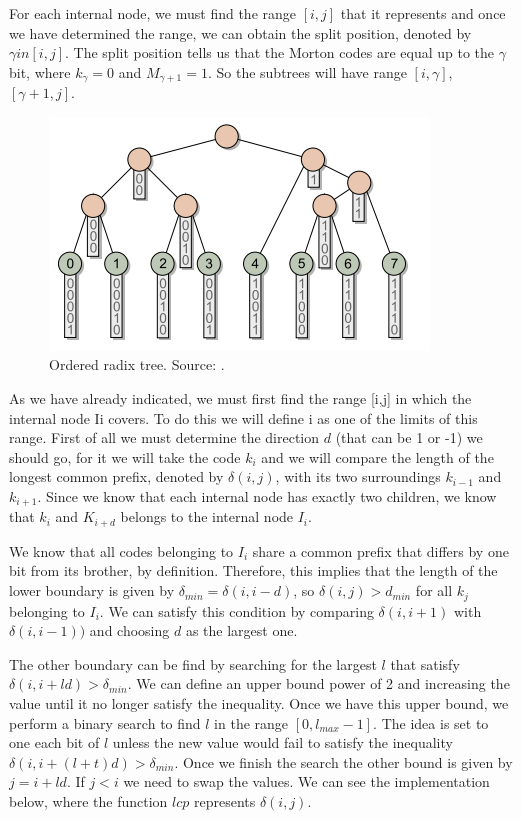 \documentclass[titlepage,12pt]{report}
\begin{document}
For each internal node, we must find the range $[i,j]$ that it represents and once we have determined the range, we can obtain the split position, denoted by $\gamma in [i,j]$. The split position tells us that the Morton codes are equal up to the $\gamma$ bit, where $k_{\gamma} = 0$ and $M_{\gamma +1} = 1$. So the subtrees will have range $[i, \gamma]$, $[\gamma+1,j]$.

\begin{figure}[H]
	\centering
	\includegraphics[scale=0.45]{media/radix_tero_1.png}
	\caption{Ordered radix tree. Source: \citep{Karras2012}.}
	\label{radix_tero}
\end{figure}

As we have already indicated, we must first find the range [i,j] in which the internal node Ii covers. To do this we will define i as one of the limits of this range. First of all we must determine the direction $d$ (that can be 1 or -1) we should go, for it we will take the code $k_i$ and we will compare the length of the longest common prefix, denoted by $\delta(i,j)$, with its two surroundings $k_{i-1}$ and $k_{i+1}$. Since we know that each internal node has exactly two children, we know that $k_i$ and $K_{i+d}$ belongs to the internal node $I_i$. 

We know that all codes belonging to $I_i$ share a common prefix that differs by one bit from its brother, by definition. Therefore, this implies that the length of the lower boundary is given by $\delta_{min} = \delta(i,i-d)$, so $\delta(i,j) > d_{min}$ for all $k_j$ belonging to $I_i$. We can satisfy this condition by comparing $\delta(i,i+1)$ with $\delta(i,i-1))$ and choosing $d$ as the largest one.

The other boundary can be find by searching for the largest $l$ that satisfy $\delta(i,i+ld) > \delta_{min}$. We can define an upper bound power of 2 and increasing the value until it no longer satisfy the inequality. Once we have this upper bound, we perform a binary search to find $l$ in the range $[0, l_{max}-1]$. The idea is set to one each bit of $l$ unless the new value would fail to satisfy the inequality $\delta(i, i + (l + t)d) > \delta_{min}$. Once we finish the search the other bound is given by $j = i + ld$. If $j < i$ we need to swap the values. We can see the implementation below, where the function $lcp$ represents $\delta(i,j)$.
\end{document}
